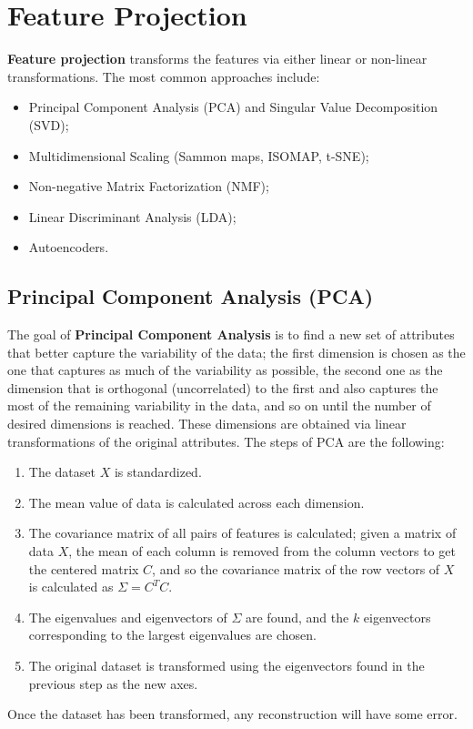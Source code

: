\section{Feature Projection}

\textbf{Feature projection} transforms the features via either linear or non-linear transformations. The most common approaches include:
\begin{itemize}
    \item Principal Component Analysis (PCA) and Singular Value Decomposition (SVD);
    
    \item Multidimensional Scaling (Sammon maps, ISOMAP, t-SNE);

    \item Non-negative Matrix Factorization (NMF);

    \item Linear Discriminant Analysis (LDA);

    \item Autoencoders.
\end{itemize}

\subsection{Principal Component Analysis (PCA)}

The goal of \textbf{Principal Component Analysis} is to find a new set of attributes that better capture the variability of the data; the first dimension is chosen as the one that captures as much of the variability as possible, the second one as the dimension that is orthogonal (uncorrelated) to the first and also captures the most of the remaining variability in the data, and so on until the number of desired dimensions is reached. These dimensions are obtained via linear transformations of the original attributes. The steps of PCA are the following:
\begin{enumerate}
    \item The dataset $X$ is standardized.
    
    \item The mean value of data is calculated across each dimension.
    
    \item The covariance matrix of all pairs of features is calculated; given a matrix of data $X$, the mean of each column is removed from the column vectors to get the centered matrix $C$, and so the covariance matrix of the row vectors of $X$ is calculated as $\Sigma = C^TC$.
    
    \item The eigenvalues and eigenvectors of $\Sigma$ are found, and the $k$ eigenvectors corresponding to the largest eigenvalues are chosen.
    
    \item The original dataset is transformed using the eigenvectors found in the previous step as the new axes.
\end{enumerate}
Once the dataset has been transformed, any reconstruction will have some error.

